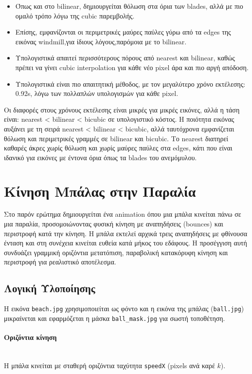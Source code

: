 \documentclass[12pt]{article}
\begin{document}
\begin{enumerate}
\begin{itemize}
    \item Όπως και στο bilinear, δημιουργείται θόλωση στα όρια των blades, αλλά με πιο ομαλό τρόπο λόγω της cubic παρεμβολής.
    \item Επίσης, εμφανίζονται οι περιμετρικές μαύρες παύλες γύρω από τα edges της εικόνας windmill,για ίδιους λόγους,παρόμοια με το bilinear.
    \item Υπολογιστικά απαιτεί περισσότερους πόρους από nearest και bilinear, καθώς πρέπει να γίνει cubic interpolation για κάθε νέο pixel άρα και πιο αργή απόδοση.
    \item Υπολογιστικά είναι πιο απαιτητική μέθοδος, με τον μεγαλύτερο χρόνο εκτέλεσης: 0.92s, λόγω των πολλαπλών υπολογισμών για κάθε pixel.
   \end{itemize}
\end{enumerate}



Οι διαφορές στους χρόνους εκτέλεσης είναι μικρές για μικρές εικόνες, αλλά η τάση είναι: nearest < bilinear < bicubic σε υπολογιστικό κόστος.
Η ποιότητα εικόνας αυξάνει με τη σειρά nearest < bilinear < bicubic, αλλά ταυτόχρονα εμφανίζεται θόλωση και περιμετρικές γραμμές σε bilinear και bicubic. Το nearest διατηρεί καθαρές άκρες χωρίς θόλωση και χωρίς μαύρες παύλες στα edges, 
κάτι που είναι ιδανικό για εικόνες με έντονα όρια όπως τα blades του ανεμόμυλου.


\section{Κίνηση Μπάλας στην Παραλία}
Στο παρόν ερώτημα δημιουργείται ένα animation όπου μια μπάλα κινείται πάνω σε μια παραλία, προσομοιώνοντας φυσική κίνηση με αναπηδήσεις (bounces) και περιστροφή κατά την κίνηση. Η μπάλα εκτελεί αρχικά τρεις αναπηδήσεις με φθίνουσα ένταση και στη συνέχεια κινείται ευθεία κατά μήκος του εδάφους. Η προσέγγιση αυτή συνδυάζει γραμμική οριζόντια μετατόπιση, 
παραβολική κατακόρυφη κίνηση και περιστροφή για ρεαλιστικό αποτέλεσμα.

\subsection{Λογική Υλοποίησης}
Η εικόνα \texttt{beach.jpg} χρησιμοποιείται ως φόντο και η εικόνα της μπάλας (\texttt{ball.jpg}) μικραίνεται και εφαρμόζεται η μάσκα \texttt{ball\_mask.jpg} για σωστή τοποθέτηση.
\paragraph{Οριζόντια κίνηση} 
\mbox{}\\
Η μπάλα κινείται με σταθερή οριζόντια ταχύτητα \texttt{speedX} (pixels ανά καρέ $k$).
\end{document}
